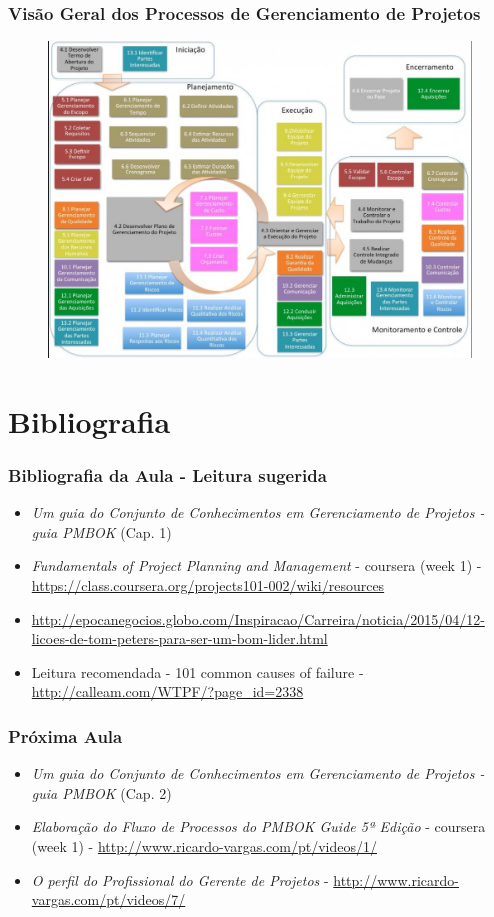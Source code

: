 \begin{frame}
 \frametitle{Visão Geral dos Processos de Gerenciamento de Projetos}
 \begin{figure}
  \centering
  \includegraphics[width = \textwidth]{figs/figura-4-1024x765.jpg}
 \end{figure}
\end{frame}
\section{Bibliografia}
\begin{frame}
 \frametitle{Bibliografia da Aula - Leitura sugerida}
 \begin{itemize}
  \item \textit{Um guia do Conjunto de Conhecimentos em Gerenciamento de Projetos - guia PMBOK} (Cap. 1)
  \item \textit{Fundamentals of Project Planning and Management} - coursera (week 1) - \url{https://class.coursera.org/projects101-002/wiki/resources}
  \item \url{http://epocanegocios.globo.com/Inspiracao/Carreira/noticia/2015/04/12-licoes-de-tom-peters-para-ser-um-bom-lider.html}
  \item Leitura recomendada - 101 common causes of failure - \url{http://calleam.com/WTPF/?page_id=2338}
 \end{itemize}

\end{frame}

\begin{frame}
 \frametitle{Próxima Aula}
 \begin{itemize}
  \item \textit{Um guia do Conjunto de Conhecimentos em Gerenciamento de Projetos - guia PMBOK} (Cap. 2)
  \item \textit{Elaboração do Fluxo de Processos do PMBOK Guide 5ª Edição} - coursera (week 1) - \url{http://www.ricardo-vargas.com/pt/videos/1/}
  \item \textit{O perfil do Profissional do Gerente de Projetos} - \url{http://www.ricardo-vargas.com/pt/videos/7/}
 \end{itemize}

\end{frame}
